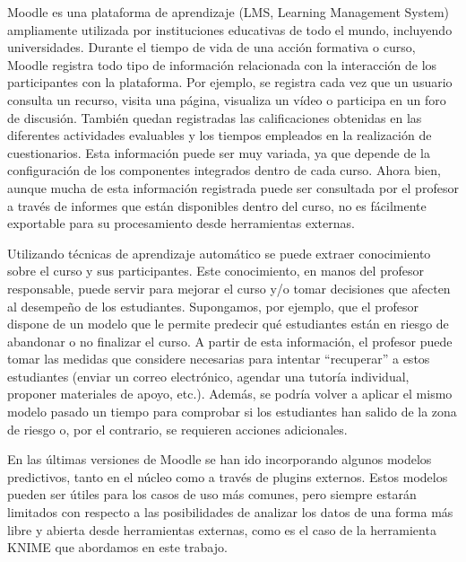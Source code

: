 
Moodle es una plataforma de aprendizaje (LMS, Learning Management System) ampliamente utilizada por instituciones educativas de todo el mundo, incluyendo universidades. 
Durante el tiempo de vida de una acción formativa o curso, Moodle registra todo tipo de información relacionada con la interacción de los participantes con la plataforma.  Por ejemplo, 
 se registra cada vez que un usuario consulta un recurso, visita una página, visualiza un vídeo o participa en un foro de discusión. También quedan registradas las 
 calificaciones obtenidas en las diferentes actividades evaluables y los tiempos empleados en la realización de cuestionarios. Esta información puede ser muy variada, 
 ya que depende de la configuración de los componentes integrados dentro de cada curso. Ahora bien, aunque mucha de esta información registrada puede ser consultada por el profesor a través de informes que están disponibles dentro del curso, no es fácilmente exportable 
 para su procesamiento desde herramientas externas. 
\

Utilizando técnicas de aprendizaje automático se puede extraer conocimiento sobre el curso y sus participantes. Este conocimiento, en manos del profesor responsable, puede servir para mejorar el curso 
y/o tomar decisiones que afecten al desempeño de los estudiantes. Supongamos, por ejemplo, que el profesor dispone de un modelo que le permite predecir qué estudiantes están en riesgo de abandonar 
o no finalizar el curso. A partir de esta información, el profesor puede tomar las medidas que considere necesarias para intentar ``recuperar'' a estos 
estudiantes (enviar un correo electrónico, agendar una tutoría individual, proponer materiales de apoyo, etc.). Además, se podría volver a aplicar el mismo modelo pasado un tiempo para comprobar si los
 estudiantes han salido de la zona de riesgo o, por el contrario, se requieren acciones adicionales. 
\

En las últimas versiones de Moodle se han ido incorporando algunos modelos predictivos, tanto en el núcleo como a través de plugins externos. Estos modelos pueden ser útiles para los casos de uso más comunes,
pero siempre estarán limitados con respecto a las posibilidades de analizar los datos de una forma más libre y abierta desde herramientas externas, como es el caso de la herramienta KNIME que abordamos en este trabajo.
\

